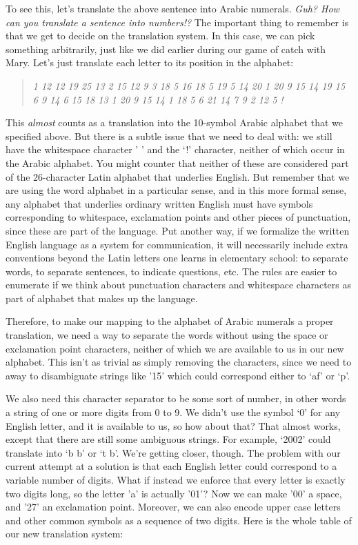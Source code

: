 \documentclass[UTF8]{book}
\begin{document}
\begin{CJK}{UTF8}{gbsn}
To see this, let's translate the above sentence into Arabic numerals. \emph{Guh? How can you translate a sentence into numbers!?} The important thing to remember is that we get to decide on the translation system. In this case, we can pick something arbitrarily, just like we did earlier during our game of catch with Mary. Let's just translate each letter to its position in the alphabet:

\begin{quotation}
\centering
\emph{1 12 12  19 25 13 2 15 12 9 3  18 5 16 18 5 19 5 14 20 1 20 9 15 14 19  15 6  9 14 6 15 18 13 1 20 9 15 14  1 18 5  6 21 14 7 9 2 12 5 !}
\end{quotation}

This \emph{almost} counts as a translation into the 10-symbol Arabic alphabet that we specified above. But there is a subtle issue that we need to deal with: we still have the whitespace character ' ' and the `!' character, neither of which occur in the Arabic alphabet. You might counter that neither of these are considered part of the 26-character Latin alphabet that underlies English. But remember that we are using the word alphabet in a particular sense, and in this more formal sense, any alphabet that underlies ordinary written English must have symbols corresponding to whitespace, exclamation points and other pieces of punctuation, since these are part of the language. Put another way, if we formalize the written English language as a system for communication, it will necessarily include extra conventions beyond the Latin letters one learns in elementary school: to separate words, to separate sentences, to indicate questions, etc. The rules are easier to enumerate if we think about punctuation characters and whitespace characters as part of alphabet that makes up the language.

Therefore, to make our mapping to the alphabet of Arabic numerals a proper translation, we need a way to separate the words without using the space or exclamation point characters, neither of which we are available to us in our new alphabet. This isn't as trivial as simply removing the characters, since we need to away to disambiguate strings like '15' which could correspond either to `af' or `p'.

We also need this character separator to be some sort of number, in other words a string of one or more digits from 0 to 9. We didn't use the symbol `0' for any English letter, and it is available to us, so how about that? That almost works, except that there are still some ambiguous strings. For example, `2002' could translate into `b  b' or `t b'. We're getting closer, though. The problem with our current attempt at a solution is that each English letter could correspond to a variable number of digits. What if instead we enforce that every letter is exactly two digits long, so the letter 'a' is actually '01'? Now we can make '00' a space, and '27' an exclamation point. Moreover, we can also encode upper case letters and other common symbols as a sequence of two digits. Here is the whole table of our new translation system:


\end{CJK}
\end{document}
